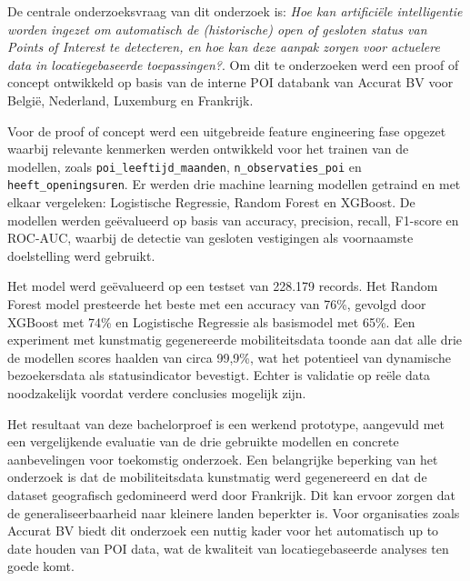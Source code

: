 De centrale onderzoeksvraag van dit onderzoek is: \textit{Hoe kan artificiële intelligentie worden ingezet om automatisch de (historische) open of gesloten status van Points of Interest te detecteren, en hoe kan deze aanpak zorgen voor actuelere data in locatiegebaseerde toepassingen?}. Om dit te onderzoeken werd een proof of concept ontwikkeld op basis van de interne POI databank van Accurat BV voor België, Nederland, Luxemburg en Frankrijk.

Voor de proof of concept werd een uitgebreide feature engineering fase opgezet waarbij relevante kenmerken werden ontwikkeld voor het trainen van de modellen, zoals \texttt{poi\_leeftijd\_maanden}, \texttt{n\_observaties\_poi} en \texttt{heeft\_openingsuren}. Er werden drie machine learning modellen getraind en met elkaar vergeleken: Logistische Regressie, Random Forest en XGBoost. De modellen werden geëvalueerd op basis van accuracy, precision, recall, F1-score en ROC-AUC, waarbij de detectie van gesloten vestigingen als voornaamste doelstelling werd gebruikt.

Het model werd geëvalueerd op een testset van 228.179 records. Het Random Forest model presteerde het beste met een accuracy van 76\%, gevolgd door XGBoost met 74\% en Logistische Regressie als basismodel met 65\%. Een experiment met kunstmatig gegenereerde mobiliteitsdata toonde aan dat alle drie de modellen scores haalden van circa 99,9\%, wat het potentieel van dynamische bezoekersdata als statusindicator bevestigt. Echter is validatie op reële data noodzakelijk voordat verdere conclusies mogelijk zijn.

Het resultaat van deze bachelorproef is een werkend prototype, aangevuld met een vergelijkende evaluatie van de drie gebruikte modellen en concrete aanbevelingen voor toekomstig onderzoek. Een belangrijke beperking van het onderzoek is dat de mobiliteitsdata kunstmatig werd gegenereerd en dat de dataset geografisch gedomineerd werd door Frankrijk. Dit kan ervoor zorgen dat de generaliseerbaarheid naar kleinere landen beperkter is. Voor organisaties zoals Accurat BV biedt dit onderzoek een nuttig kader voor het automatisch up to date houden van POI data, wat de kwaliteit van locatiegebaseerde analyses ten goede komt.